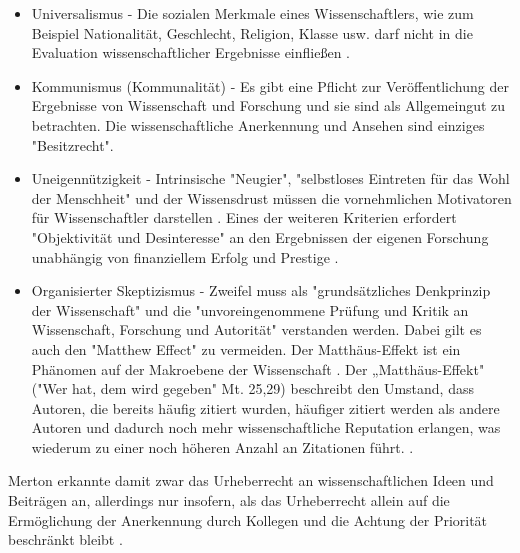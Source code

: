 \begin{itemize}
\item Universalismus - Die sozialen Merkmale eines Wissenschaftlers, wie zum Beispiel Nationalität, Geschlecht, Religion, Klasse usw. darf nicht in die Evaluation wissenschaftlicher Ergebnisse einfließen \cite{suchen}.
\item Kommunismus (Kommunalität) - Es gibt eine Pflicht zur Veröffentlichung der Ergebnisse von Wissenschaft und Forschung und sie sind als Allgemeingut zu betrachten. Die wissenschaftliche Anerkennung und Ansehen sind einziges "Besitzrecht"\cite{suchen}.
\item Uneigennützigkeit - Intrinsische "Neugier"\cite{suchen}, "selbstloses Eintreten für das Wohl der Menschheit"\cite{suchen} und der Wissensdrust müssen die vornehmlichen Motivatoren für Wissenschaftler darstellen \cite{suchen}. Eines der weiteren Kriterien erfordert "Objektivität und Desinteresse" an den Ergebnissen der eigenen Forschung \cite{suchen} unabhängig von finanziellem Erfolg und Prestige \cite{suchen}. 
\item Organisierter Skeptizismus - Zweifel muss als "grundsätzliches Denkprinzip der Wissenschaft" \cite{suchen} und die "unvoreingenommene Prüfung und Kritik an Wissenschaft, Forschung und Autorität" \cite{suchen} verstanden werden. Dabei gilt es auch den "Matthew Effect" zu vermeiden. Der Matthäus-Effekt ist ein Phänomen auf der Makroebene der Wissenschaft \cite{bonitz_1998_matthaus}. Der „Matthäus-Effekt" ("Wer hat, dem wird gegeben" Mt. 25,29) beschreibt den Umstand, dass Autoren, die bereits häufig zitiert wurden, häufiger zitiert werden als andere Autoren und dadurch noch mehr wissenschaftliche Reputation erlangen, was wiederum zu einer noch höheren Anzahl an Zitationen führt. \cite{Merton_1968} \cite{meier_2009_matthaus}.
\end{itemize}

Merton erkannte damit zwar das Urheberrecht an wissenschaftlichen Ideen und Beiträgen an, allerdings nur insofern, als das Urheberrecht allein auf die Ermöglichung der Anerkennung durch Kollegen und die Achtung der Priorität beschränkt bleibt \cite{Fangerau_2014}.

